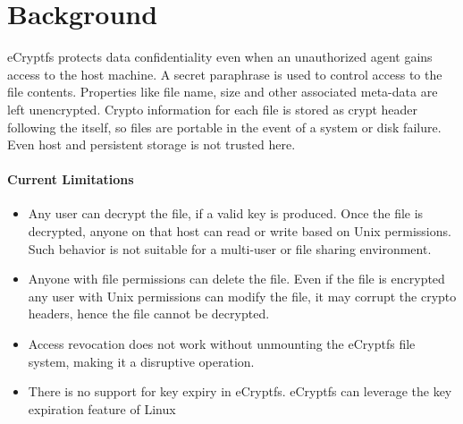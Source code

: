 \section{Background}
\label{bg}

%
%
%
%
%
%
%

eCryptfs protects data confidentiality even when an unauthorized agent
gains access to the host machine.  A secret paraphrase is used to
control access to the file contents.  Properties like file name, size
and other associated meta-data are left unencrypted.  Crypto
information for each file is stored as crypt header following the
itself, so files are portable in the event of a system or disk
failure.  Even host and persistent storage is not trusted here.

\paragraph{Current Limitations}
\begin{itemize}
\item Any user can decrypt the file, if a valid key is produced.  Once
	the file is decrypted, anyone on that host can read or write
	based on Unix permissions.  Such behavior is not suitable for
	a multi-user or file sharing environment.
\item Anyone with file permissions can delete the file.  Even if the
	file is encrypted any user with Unix permissions can modify
	the file, it may corrupt the crypto headers, hence the file
	cannot be decrypted.
\item Access revocation does not work without unmounting the eCryptfs
	file system, making it a disruptive operation.
\item There is no support for key expiry in eCryptfs.  eCryptfs can
	leverage the key expiration feature of Linux
\end{itemize}

